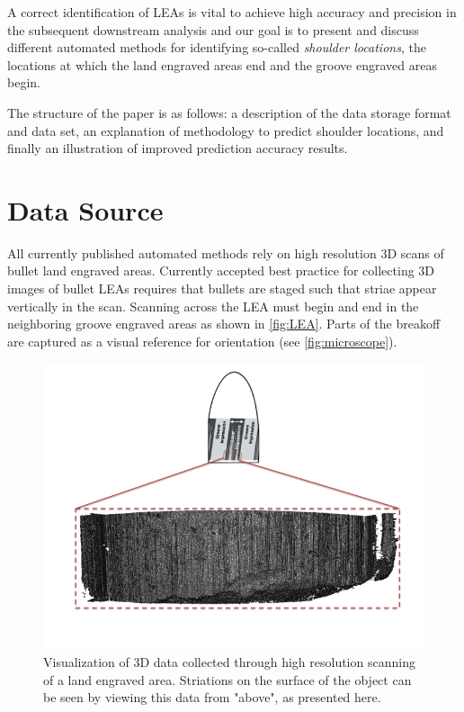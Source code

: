\documentclass[12pt]{article}
\begin{document}
A correct identification of LEAs is vital to achieve high accuracy and
precision in the subsequent downstream analysis and our goal is to
present and discuss different automated methods for identifying
so-called \emph{shoulder locations}, the locations at which the land
engraved areas end and the groove engraved areas begin.

The structure of the paper is as follows: a description of the data
storage format and data set, an explanation of methodology to predict
shoulder locations, and finally an illustration of improved prediction
accuracy results.

\section{Data Source}

All currently published automated methods rely on high resolution 3D
scans of bullet land engraved areas. Currently accepted best practice
for collecting 3D images of bullet LEAs requires that bullets are staged
such that striae appear vertically in the scan. Scanning across the LEA
must begin and end in the neighboring groove engraved areas as shown in
\autoref{fig:LEA}. Parts of the breakoff are captured as a visual
reference for orientation (see \autoref{fig:microscope}).

\begin{figure}
\includegraphics[width=\textwidth]{./images/3d_plot_top_context_breakoff} \caption{\label{LEA}Visualization of 3D data collected through high resolution scanning of a land engraved area. Striations on the surface of the object can be seen by viewing this data from "above", as presented here.}\label{fig:LEA}
\end{figure}
\end{document}
